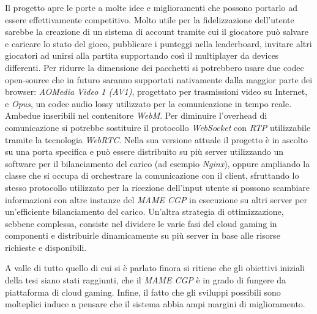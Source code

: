 Il progetto apre le porte a molte idee e miglioramenti che possono portarlo ad essere effettivamente competitivo. Molto utile per la fidelizzazione dell'utente sarebbe la creazione di un sistema di account tramite cui il giocatore può salvare e caricare lo stato del gioco, pubblicare i punteggi nella leaderboard, invitare altri giocatori ad unirsi alla partita supportando così il multiplayer da devices differenti. Per ridurre la dimensione dei pacchetti si potrebbero usare due codec open-source che in futuro saranno supportati nativamente dalla maggior parte dei browser: \textit{AOMedia Video 1 (AV1)}, progettato per trasmissioni video su Internet, e \textit{Opus}, un codec audio lossy utilizzato per la comunicazione in tempo reale. Ambedue inseribili nel contenitore \textit{WebM}. Per diminuire l'overhead di comunicazione si potrebbe sostituire il protocollo \textit{WebSocket} con \textit{RTP} utilizzabile tramite la tecnologia \textit{WebRTC}. Nella sua versione attuale il progetto è in ascolto su una porta specifica e può essere distribuito su più server utilizzando un software per il bilanciamento del carico (ad esempio \textit{Nginx}), oppure ampliando la classe che si occupa di orchestrare la comunicazione con il client, sfruttando lo stesso protocollo utilizzato per la ricezione dell'input utente si possono scambiare informazioni con altre instanze del \textit{MAME CGP} in esecuzione su altri server per un'efficiente bilanciamento del carico. Un'altra strategia di ottimizzazione, sebbene complessa, consiste nel dividere le varie fasi del cloud gaming in componenti e distribuirle dinamicamente su più server in base alle risorse richieste e disponibili.

A valle di tutto quello di cui si è parlato finora si ritiene che gli obiettivi iniziali della tesi siano stati raggiunti, che il \textit{MAME CGP} è in grado di fungere da piattaforma di cloud gaming. Infine, il fatto che gli sviluppi possibili sono molteplici induce a pensare che il sistema abbia ampi margini di miglioramento.